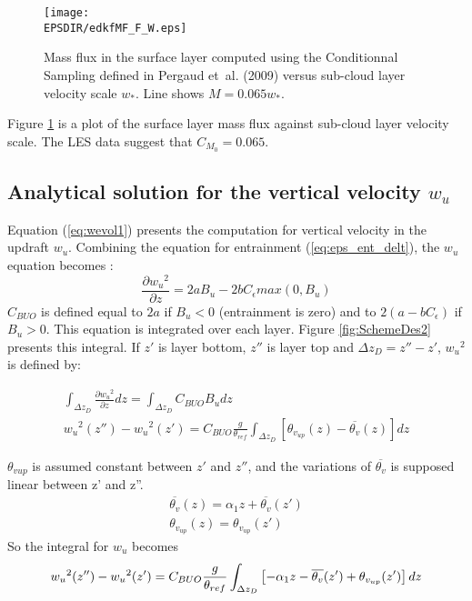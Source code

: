 \begin{figure}
 \begin{center}
		\texttt{[image: \\EPSDIR/edkfMF\_F\_W.eps]}
	\end{center}
	\caption{Mass flux in the surface layer computed using the Conditionnal Sampling defined in Pergaud et~al. (2009) versus sub-cloud layer velocity scale $w_*$. Line shows $M=0.065w_*$.}
	\label{fig:MF_F_W}
\end{figure}

Figure \ref{fig:MF_F_W} is a plot of the surface layer mass flux against sub-cloud layer velocity scale. The LES data suggest that $C_{M_0}=0.065$.

\subsection{Analytical solution for the vertical velocity $w_u$}
\label{sec:annexe_w}
Equation (\ref{eq:wevol1}) presents the computation for vertical velocity in the updraft $w_u$. Combining the equation for entrainment (\ref{eq:eps_ent_delt}), the $w_u$ equation becomes :
\begin{equation}
   \frac{\partial{{w_u}^2}} {\partial{z}}=2 a B_u-2 b C_{\epsilon}max(0,B_u)
\label{eq:wevol2}
\end{equation}
$C_{BUO}$ is defined equal to $2a$ if $B_u<0$ (entrainment is zero) and to $2(a-bC_{\epsilon})$ if $B_u>0$.
This equation is integrated over each layer. Figure \ref{fig:SchemeDes2} presents this integral. If $z'$ is layer bottom, $z''$ is layer top and $\Delta z_D = z''-z'$,  ${w_u}^2$ is defined by:

\begin{eqnarray}
   \int_{\Delta z_D}\frac{\partial{{w_u}^2}}{\partial{z}}dz=\int_{\Delta z_D} C_{BUO} B_u dz\\
   {w_u}^2(z'')-{w_u}^2(z')= C_{BUO}\frac{g}{\theta_{ref}}\int_{\Delta z_D} \left[    \theta_{v_{up}}(z)-\overline{\theta_v}(z)\right]  dz
   \label{eq:primitive1}
\end{eqnarray}

$\theta_{vup}$ is assumed constant between $z'$ and $z''$, and the variations of $\overline{\theta_v}$ is supposed linear between z' and z''.
\begin{eqnarray}
   \overline{\theta_v}(z)= \alpha_1 z + \overline{\theta_v}(z')\\
   \theta_{v_{up}}(z)    = \theta_{v_{up}}(z')
   \label{eq:fonction_lineaire}
\end{eqnarray}
So the integral for $w_u$ becomes
\begin{equation}
   {w_u}^2(z'') - {w_u}^2(z')= C_{BUO}\frac{g}{\theta_{ref}}\int_{\Delta z_D} \left[- \alpha_1z - \overline{\theta_v}(z') + \theta_{v_{up}}(z')\right]  dz \\
   \label{eq:primitive2}
\end{equation}


